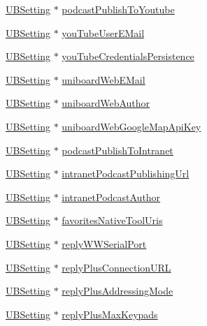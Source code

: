 \begin{DoxyCompactItemize}
\hyperlink{class_u_b_setting}{U\-B\-Setting} $\ast$ \hyperlink{class_u_b_settings_a6b089347aa3dc84801f3f4979547e852}{podcast\-Publish\-To\-Youtube}
\item 
\hyperlink{class_u_b_setting}{U\-B\-Setting} $\ast$ \hyperlink{class_u_b_settings_a40322cccbd808bcdb2e088411f0e9b7b}{you\-Tube\-User\-E\-Mail}
\item 
\hyperlink{class_u_b_setting}{U\-B\-Setting} $\ast$ \hyperlink{class_u_b_settings_ac1c11264ddacac37cbf0561f195f637b}{you\-Tube\-Credentials\-Persistence}
\item 
\hyperlink{class_u_b_setting}{U\-B\-Setting} $\ast$ \hyperlink{class_u_b_settings_a6c126b94fae10229b3df238222828ae8}{uniboard\-Web\-E\-Mail}
\item 
\hyperlink{class_u_b_setting}{U\-B\-Setting} $\ast$ \hyperlink{class_u_b_settings_a2bc708f57654f04563cf29d82d9d9d6a}{uniboard\-Web\-Author}
\item 
\hyperlink{class_u_b_setting}{U\-B\-Setting} $\ast$ \hyperlink{class_u_b_settings_aa52b8e29071c46d7c615b0528003bc4c}{uniboard\-Web\-Google\-Map\-Api\-Key}
\item 
\hyperlink{class_u_b_setting}{U\-B\-Setting} $\ast$ \hyperlink{class_u_b_settings_aba633a0fc798b1d99a211f211812ae05}{podcast\-Publish\-To\-Intranet}
\item 
\hyperlink{class_u_b_setting}{U\-B\-Setting} $\ast$ \hyperlink{class_u_b_settings_a999bfab8413c0310904a2ea0584104e8}{intranet\-Podcast\-Publishing\-Url}
\item 
\hyperlink{class_u_b_setting}{U\-B\-Setting} $\ast$ \hyperlink{class_u_b_settings_a892b406d947337b92a2590fb638f4730}{intranet\-Podcast\-Author}
\item 
\hyperlink{class_u_b_setting}{U\-B\-Setting} $\ast$ \hyperlink{class_u_b_settings_aee964b872d72f35bd573653ead9256db}{favorites\-Native\-Tool\-Uris}
\item 
\hyperlink{class_u_b_setting}{U\-B\-Setting} $\ast$ \hyperlink{class_u_b_settings_adaf41115f2bd2098819ae25afb294494}{reply\-W\-W\-Serial\-Port}
\item 
\hyperlink{class_u_b_setting}{U\-B\-Setting} $\ast$ \hyperlink{class_u_b_settings_ac615d44f786768589ce4169d1a40b221}{reply\-Plus\-Connection\-U\-R\-L}
\item 
\hyperlink{class_u_b_setting}{U\-B\-Setting} $\ast$ \hyperlink{class_u_b_settings_a2ba584c3e49ef6154fdee73bdc41546a}{reply\-Plus\-Addressing\-Mode}
\item 
\hyperlink{class_u_b_setting}{U\-B\-Setting} $\ast$ \hyperlink{class_u_b_settings_a5a1f043b21863c24b34640600a9db784}{reply\-Plus\-Max\-Keypads}

\end{DoxyCompactItemize}
